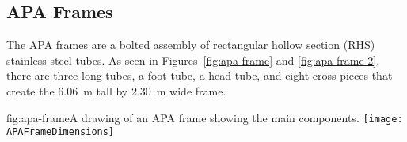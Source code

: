 



\subsection{APA Frames}
\label{sec:fdsp-apa-frames}

The APA frames are a bolted assembly of rectangular hollow section (RHS) stainless steel tubes.  As seen in Figures~\ref{fig:apa-frame} and \ref{fig:apa-frame-2}, there are three long tubes, a foot tube, a head tube, and eight cross-pieces that create the \SI{6.06}{m} tall by \SI{2.30}{m} wide frame. 

\begin{dunefigure}{fig:apa-frame}{A drawing of an APA frame showing the main components. }
\texttt{[image: APAFrameDimensions]} 
\end{dunefigure}

